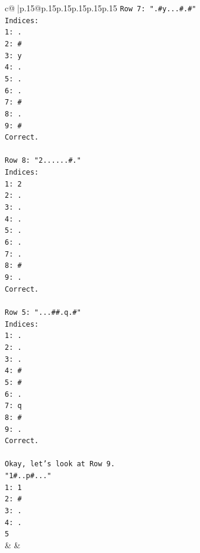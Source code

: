 \documentclass{article}
\begin{document}
{\begin{supertabular}{c@{$\;$}|p{.15\linewidth}@{}p{.15\linewidth}p{.15\linewidth}p{.15\linewidth}p{.15\linewidth}p{.15\linewidth}}
{{{\texttt{Row 7: ".\#y...\#.\#"} \\
\texttt{Indices:} \\
\texttt{1: .} \\
\texttt{2: \#} \\
\texttt{3: y} \\
\texttt{4: .} \\
\texttt{5: .} \\
\texttt{6: .} \\
\texttt{7: \#} \\
\texttt{8: .} \\
\texttt{9: \#} \\
\texttt{Correct.} \\
\\ 
\texttt{Row 8: "2......\#."} \\
\texttt{Indices:} \\
\texttt{1: 2} \\
\texttt{2: .} \\
\texttt{3: .} \\
\texttt{4: .} \\
\texttt{5: .} \\
\texttt{6: .} \\
\texttt{7: .} \\
\texttt{8: \#} \\
\texttt{9: .} \\
\texttt{Correct.} \\
\\ 
\texttt{Row 5: "...\#\#.q.\#"} \\
\texttt{Indices:} \\
\texttt{1: .} \\
\texttt{2: .} \\
\texttt{3: .} \\
\texttt{4: \#} \\
\texttt{5: \#} \\
\texttt{6: .} \\
\texttt{7: q} \\
\texttt{8: \#} \\
\texttt{9: .} \\
\texttt{Correct.} \\
\\ 
\texttt{Okay, let's look at Row 9.} \\
\texttt{"1\#..p\#..."} \\
\texttt{1: 1} \\
\texttt{2: \#} \\
\texttt{3: .} \\
\texttt{4: .} \\
\texttt{5} \\
            }
        }
    }
    & & \\ \\


\end{supertabular}}
\end{document}
